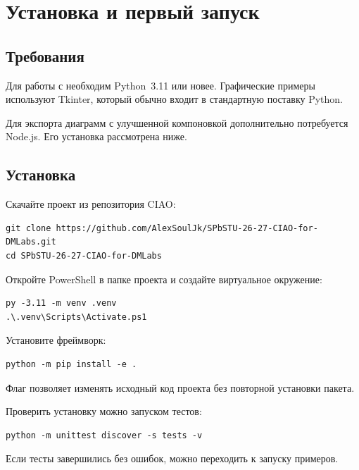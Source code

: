 
\chapter{Установка и первый запуск}
\label{chap:getting-started}

\section{Требования}

Для работы с \CIAO{} необходим Python~3.11 или новее.
Графические примеры используют Tkinter, который обычно
входит в стандартную поставку Python.

Для экспорта диаграмм с улучшенной компоновкой
дополнительно потребуется Node.js. Его установка
рассмотрена ниже.

\section{Установка}

Скачайте проект из репозитория CIAO:

\begin{lstlisting}[language={},numbers=none]
git clone https://github.com/AlexSoulJk/SPbSTU-26-27-CIAO-for-DMLabs.git
cd SPbSTU-26-27-CIAO-for-DMLabs
\end{lstlisting}

Откройте PowerShell в папке проекта и создайте
виртуальное окружение:

\begin{lstlisting}[language={},numbers=none]
py -3.11 -m venv .venv
.\.venv\Scripts\Activate.ps1
\end{lstlisting}

Установите фреймворк:

\begin{lstlisting}[language={},numbers=none]
python -m pip install -e .
\end{lstlisting}

Флаг  позволяет изменять исходный код проекта
без повторной установки пакета.

Проверить установку можно запуском тестов:

\begin{lstlisting}[language={},numbers=none]
python -m unittest discover -s tests -v
\end{lstlisting}

\begin{resultbox}
Если тесты завершились без ошибок, можно переходить
к запуску примеров.
\end{resultbox}

